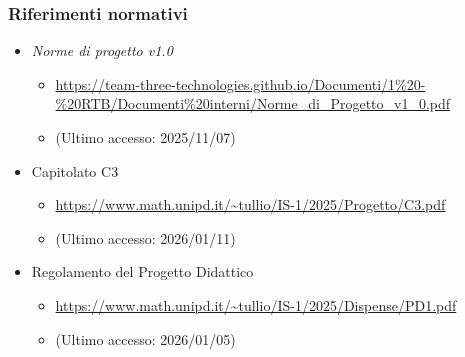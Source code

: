 \documentclass[a4paper,12pt]{article}
\begin{document}
{            \subsubsection{Riferimenti normativi}
                \begin{itemize}
                    \item \textit{Norme di progetto v1.0}
                    \begin{itemize}
                        \item \url{https://team-three-technologies.github.io/Documenti/1%20-%20RTB/Documenti%20interni/Norme_di_Progetto_v1_0.pdf}
                        \item[] (Ultimo accesso: 2025/11/07)
                    \end{itemize}
                    \item Capitolato C3
                    \begin{itemize}
                        \item \url{https://www.math.unipd.it/~tullio/IS-1/2025/Progetto/C3.pdf}
                        \item[] (Ultimo accesso: 2026/01/11)
                    \end{itemize}
                    \item Regolamento del Progetto Didattico
                    \begin{itemize}
                        \item \url{https://www.math.unipd.it/~tullio/IS-1/2025/Dispense/PD1.pdf}
                        \item[] (Ultimo accesso: 2026/01/05)
                    \end{itemize}
                \end{itemize}
}
\end{document}
